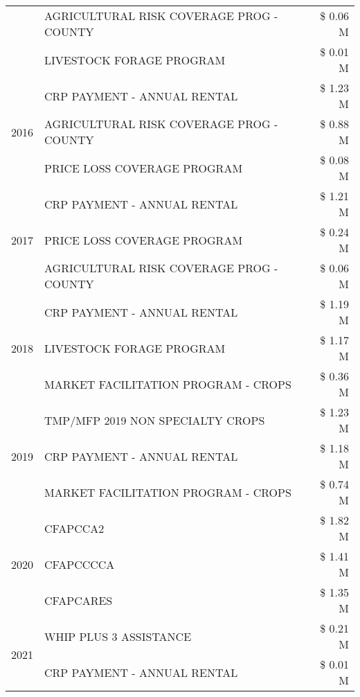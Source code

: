\begin{tabular}{llr}
 & AGRICULTURAL RISK COVERAGE PROG - COUNTY & \$ 0.06 M \\
 & LIVESTOCK FORAGE PROGRAM & \$ 0.01 M \\
\cline{1-3}
\multirow[t]{3}{*}{2016} & CRP PAYMENT - ANNUAL RENTAL & \$ 1.23 M \\
 & AGRICULTURAL RISK COVERAGE PROG - COUNTY & \$ 0.88 M \\
 & PRICE LOSS COVERAGE PROGRAM & \$ 0.08 M \\
\cline{1-3}
\multirow[t]{3}{*}{2017} & CRP PAYMENT - ANNUAL RENTAL & \$ 1.21 M \\
 & PRICE LOSS COVERAGE PROGRAM & \$ 0.24 M \\
 & AGRICULTURAL RISK COVERAGE PROG - COUNTY & \$ 0.06 M \\
\cline{1-3}
\multirow[t]{3}{*}{2018} & CRP PAYMENT - ANNUAL RENTAL & \$ 1.19 M \\
 & LIVESTOCK FORAGE PROGRAM & \$ 1.17 M \\
 & MARKET FACILITATION PROGRAM - CROPS & \$ 0.36 M \\
\cline{1-3}
\multirow[t]{3}{*}{2019} & TMP/MFP 2019 NON SPECIALTY CROPS & \$ 1.23 M \\
 & CRP PAYMENT - ANNUAL RENTAL & \$ 1.18 M \\
 & MARKET FACILITATION PROGRAM - CROPS & \$ 0.74 M \\
\cline{1-3}
\multirow[t]{3}{*}{2020} & CFAPCCA2 & \$ 1.82 M \\
 & CFAPCCCCA & \$ 1.41 M \\
 & CFAPCARES & \$ 1.35 M \\
\cline{1-3}
\multirow[t]{2}{*}{2021} & WHIP PLUS 3 ASSISTANCE & \$ 0.21 M \\
 & CRP PAYMENT - ANNUAL RENTAL & \$ 0.01 M \\
\cline{1-3}
\bottomrule
\end{tabular}
